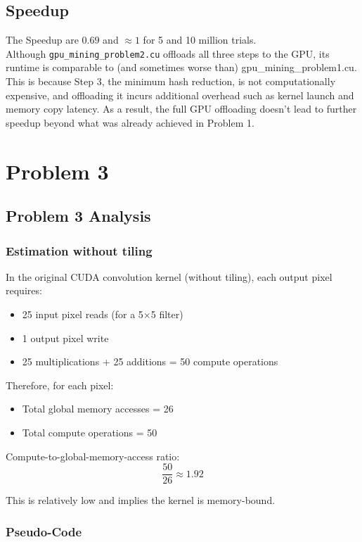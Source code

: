 \documentclass[11pt]{article}
\begin{document}
\subsection{Speedup}
\label{sec:org0028e0b}

The Speedup are \(0.69\) and \(\approx 1\) for 5 and 10 million trials.\\

Although \texttt{gpu\_mining\_problem2.cu} offloads all three steps to the GPU, its runtime is comparable to (and sometimes worse than) gpu\_mining\_problem1.cu. This is because Step 3, the minimum hash reduction, is not computationally expensive, and offloading it incurs additional overhead such as kernel launch and memory copy latency. As a result, the full GPU offloading doesn't lead to further speedup beyond what was already achieved in Problem 1.
\newpage
\section{Problem 3}
\label{sec:orge0d502d}
\subsection{Problem 3 Analysis}
\label{sec:org6d3e609}
\subsubsection{Estimation without tiling}
\label{sec:org5c9f2cb}
In the original CUDA convolution kernel (without tiling), each output pixel requires:
\begin{itemize}
\item 25 input pixel reads (for a 5×5 filter)
\item 1 output pixel write
\item 25 multiplications + 25 additions = 50 compute operations
\end{itemize}

Therefore, for each pixel:
\begin{itemize}
\item Total global memory accesses = 26
\item Total compute operations = 50
\end{itemize}

Compute-to-global-memory-access ratio:
\[
\frac{50}{26} \approx 1.92
\]

This is relatively low and implies the kernel is memory-bound.
\subsubsection{Pseudo-Code}
\label{sec:orgddd9cd2}
\end{document}
